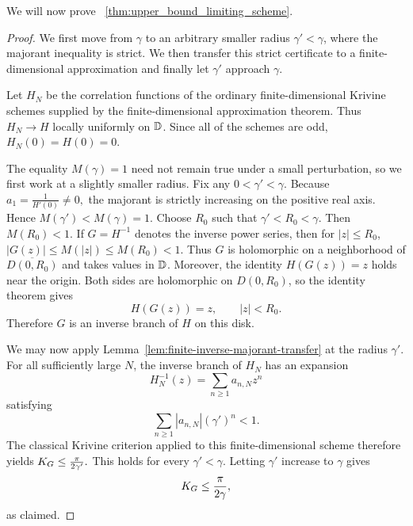 We will now prove ~\cref{thm:upper_bound_limiting_scheme}.

\begin{proof}
We first move from $\gamma$ to an arbitrary smaller radius $\gamma'<\gamma$, where the majorant inequality is strict. We then transfer this strict certificate to a finite-dimensional approximation and finally let $\gamma'$ approach $\gamma$.

Let $H_N$ be the correlation functions of the ordinary finite-dimensional
Krivine schemes supplied by the finite-dimensional approximation theorem.
Thus
\(
H_N\longrightarrow H
\)
locally uniformly on $\mathbb D$. Since all of the schemes are odd,
$H_N(0)=H(0)=0$.

The equality $M(\gamma)=1$ need not remain true under a small perturbation,
so we first work at a slightly smaller radius. Fix any
\(
0<\gamma'<\gamma.
\)
Because
\(
a_1=\frac{1}{H'(0)}\neq 0,
\)
the majorant is strictly increasing on the positive real axis. Hence
\(
M(\gamma')<M(\gamma)=1.
\)
Choose $R_0$ such that
\(
\gamma'<R_0<\gamma.
\)
Then $M(R_0)<1$. If $G=H^{-1}$ denotes the inverse power series, then for
$|z|\leq R_0$,
\(
|G(z)|
\leq
M(|z|)
\leq
M(R_0)
<1.
\)
Thus $G$ is holomorphic on a neighborhood of
$\overline{D(0,R_0)}$ and takes values in $\mathbb D$. Moreover, the identity
$H(G(z))=z$ holds near the origin. Both sides are holomorphic on
$D(0,R_0)$, so the identity theorem gives
\[
H(G(z))=z,
\qquad |z|<R_0.
\]
Therefore $G$ is an inverse branch of $H$ on this disk.

We may now apply Lemma~\ref{lem:finite-inverse-majorant-transfer} at the
radius $\gamma'$. For all sufficiently large $N$, the inverse branch of
$H_N$ has an expansion
\[
H_N^{-1}(z)=\sum_{n\geq 1}a_{n,N}z^n
\]
satisfying
\[
\sum_{n\geq 1}|a_{n,N}|(\gamma')^n<1.
\]
The classical Krivine criterion applied to this finite-dimensional scheme
therefore yields
\(
K_G\leq \frac{\pi}{2\gamma'}.
\)
This holds for every $\gamma'<\gamma$. Letting $\gamma'$ increase to
$\gamma$ gives
\[
K_G\leq \frac{\pi}{2\gamma},
\]
as claimed.
\end{proof}
